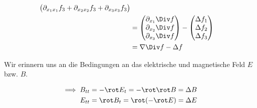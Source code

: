 \begin{solution}
\begin{enumerate}[label = (\roman*)]
\begin{align*}
\begin{pmatrix}
            \partial_{x_1 x_1} f_3 + \partial_{x_2 x_2} f_3 + \partial_{x_3 x_3} f_3 \\
        \end{pmatrix} \\
        & =
        \begin{pmatrix}
            \partial_{x_1} \Div f \\
            \partial_{x_2} \Div f \\
            \partial_{x_3} \Div f
        \end{pmatrix}
        -
        \begin{pmatrix}
            \Delta f_1 \\
            \Delta f_2 \\
            \Delta f_3
        \end{pmatrix} \\
        & =
        \nabla \Div f
        -
        \Delta f
    \end{align*}

    Wir erinnern uns an die Bedingungen an das elektrische und magnetische Feld $E$ bzw. $B$.

    \begin{align*}
        \implies
        B_{tt} & = -\rot E_t = -\rot \rot B = \Delta B \\
        E_{tt} & = \rot B_t = \rot(-\rot E) = \Delta E
    \end{align*}

\end{enumerate}
    
\end{solution}

